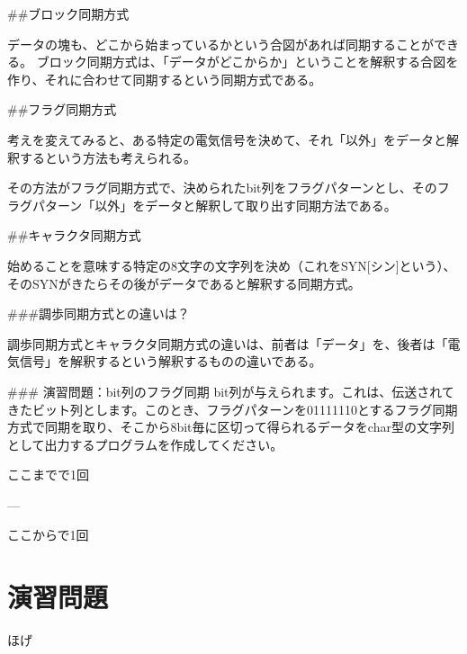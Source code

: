 ##ブロック同期方式

データの塊も、どこから始まっているかという合図があれば同期することができる。
ブロック同期方式は、「データがどこからか」ということを解釈する合図を作り、それに合わせて同期するという同期方式である。

##フラグ同期方式

考えを変えてみると、ある特定の電気信号を決めて、それ「以外」をデータと解釈するという方法も考えられる。

その方法がフラグ同期方式で、決められたbit列をフラグパターンとし、そのフラグパターン「以外」をデータと解釈して取り出す同期方法である。

##キャラクタ同期方式

始めることを意味する特定の8文字の文字列を決め（これをSYN[シン]という）、そのSYNがきたらその後がデータであると解釈する同期方式。

###調歩同期方式との違いは？

調歩同期方式とキャラクタ同期方式の違いは、前者は「データ」を、後者は「電気信号」を解釈するという解釈するものの違いである。

### 演習問題：bit列のフラグ同期
bit列が与えられます。これは、伝送されてきたビット列とします。このとき、フラグパターンを01111110とするフラグ同期方式で同期を取り、そこから8bit毎に区切って得られるデータをchar型の文字列として出力するプログラムを作成してください。

ここまでで1回

---

ここからで1回



\section{}

\section*{演習問題}
\begin{problems}
\item ほげ
\end{problems}

